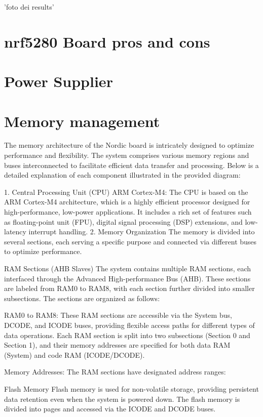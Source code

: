 \documentclass{Configuration_Files/PoliMi3i_thesis}
\begin{document}
'foto dei results'



\section{nrf5280 Board pros and cons}
\section{Power Supplier}
\section{Memory management}

The memory architecture of the Nordic board is intricately designed to optimize performance and flexibility. The system comprises various memory regions and buses interconnected to facilitate efficient data transfer and processing. Below is a detailed explanation of each component illustrated in the provided diagram:

1. Central Processing Unit (CPU)
ARM Cortex-M4: The CPU is based on the ARM Cortex-M4 architecture, which is a highly efficient processor designed for high-performance, low-power applications. It includes a rich set of features such as floating-point unit (FPU), digital signal processing (DSP) extensions, and low-latency interrupt handling.
2. Memory Organization
The memory is divided into several sections, each serving a specific purpose and connected via different buses to optimize performance.

RAM Sections (AHB Slaves)
The system contains multiple RAM sections, each interfaced through the Advanced High-performance Bus (AHB). These sections are labeled from RAM0 to RAM8, with each section further divided into smaller subsections. The sections are organized as follows:

RAM0 to RAM8: These RAM sections are accessible via the System bus, DCODE, and ICODE buses, providing flexible access paths for different types of data operations. Each RAM section is split into two subsections (Section 0 and Section 1), and their memory addresses are specified for both data RAM (System) and code RAM (ICODE/DCODE).

Memory Addresses: The RAM sections have designated address ranges:

Flash Memory
Flash memory is used for non-volatile storage, providing persistent data retention even when the system is powered down. The flash memory is divided into pages and accessed via the ICODE and DCODE buses.
\end{document}
